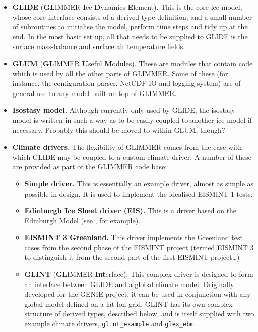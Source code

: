 \begin{itemize}
\item \textbf{GLIDE} (\textbf{GL}IMMER \textbf{I}ce \textbf{D}ynamics
  \textbf{E}lement). This is the core ice model, whose core interface consists
  of a derived type definition, and a small number of subroutines to
  initialise the model, perform time steps and tidy up at the end. In the most
  basic set up, all that needs to be supplied to GLIDE is the surface
  mass-balance and surface air temperature fields.
\item \textbf{GLUM} (\textbf{GL}IMMER \textbf{U}seful \textbf{M}odules). These
  are modules that contain code which is used by all the other parts of
  GLIMMER. Some of these (for instance, the configuration parser, NetCDF IO
  and logging system) are of general use to any model built on top of
  GLIMMER.
\item \textbf{Isostasy model.} Although currently only used by GLIDE, the
  isostasy model is written in such a way as to be easily coupled to another
  ice model if necessary. Probably this should be moved to within GLUM,
  though?
\item \textbf{Climate drivers.} The flexibility of GLIMMER comes from the ease
  with which GLIDE may be coupled to a custom climate driver. A number of
  these are provided as part of the GLIMMER code base:
\begin{itemize}
\item \textbf{Simple driver.} This is essentially an example driver, almost as simple
  as possible in design. It is used to implement the idealised EISMINT 1
  tests.
\item \textbf{Edinburgh Ice Sheet driver (EIS).} This is a driver based on the
  Edinburgh Model (see \cite{Hagdorn2003}, for example).
\item \textbf{EISMINT 3 Greenland.} This driver implements the Greenland test
  cases from the second phase of the EISMINT project (termed EISMINT 3 to
  distinguish it from the second part of the first EISMINT project\ldots)
\item \textbf{GLINT} (\textbf{GL}IMMER \textbf{Int}erface). This complex
  driver is designed to form an interface between GLIDE and a global climate
  model. Originally developed for the GENIE project, it can be used in
  conjunction with any global model defined on a lat-lon grid. GLINT has its
  own complex structure of derived types, described below, and is itself
  supplied with two example climate drivers, \texttt{glint\_example} and \texttt{glex\_ebm}.
\end{itemize}
\end{itemize}
%
